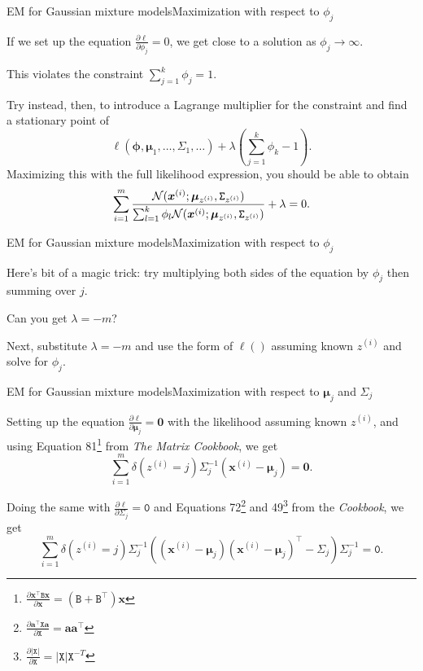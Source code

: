 \documentclass{beamer}
\renewcommand{\vec}[1]{\boldsymbol{#1}}
\newcommand{\mat}[1]{\mathtt{#1}}
\begin{document}
\begin{frame}{EM for Gaussian mixture models}{Maximization with respect to $\phi_j$}

  If we set up the equation
  $\frac{\partial \ell}{\partial \phi_j} = 0$,
  we get close to a solution as $\phi_j \rightarrow \infty$.

  \medskip

  This violates the constraint $\sum_{j=1}^k \phi_j = 1$.

  \medskip

  Try instead, then, to introduce a Lagrange multiplier for the
  constraint and find a stationary point of
  \[ \ell(\vec{\phi},\vec{\mu}_1,\ldots,\mat{\Sigma}_1,\ldots) + \lambda
  \left( \sum_{j=1}^k \phi_k - 1 \right). \]
  Maximizing this with the
  full likelihood expression, you should be able to obtain
  \[ \sum_{i=1}^m \frac{{\cal N}(\vec{x}^{(i)};\vec{\mu}_{z^{(i)}},\mat{\Sigma}_{z^{(i)}})}{\sum_{l=1}^k \phi_l {\cal N}(\vec{x}^{(i)};\vec{\mu}_{z^{(i)}},\mat{\Sigma}_{z^{(i)}})} + \lambda = 0. \]
  
\end{frame}


\begin{frame}{EM for Gaussian mixture models}{Maximization with respect to $\phi_j$}

  Here's bit of a magic trick: try multiplying both sides of the
  equation by $\phi_j$ then summing over $j$.

  \medskip

  Can you get $\lambda = -m$?

  \medskip

  Next, substitute $\lambda = -m$ and use the form of $\ell()$
  assuming known $z^{(i)}$ and solve for $\phi_j$.
  
\end{frame}


\begin{frame}{EM for Gaussian mixture models}{Maximization with respect to $\vec{\mu}_j$ and $\mat{\Sigma}_j$}

  Setting up the equation
  $\frac{\partial \ell}{\partial \vec{\mu}_j} = \vec{0}$
  with the likelihood assuming known $z^{(i)}$, and using
  Equation 81\footnote{$\frac{\partial \vec{x}^\top \mat{B} \vec{x}}{\partial \vec{x}} = (\mat{B}+\mat{B}^\top)\vec{x}$} from \textit{The Matrix Cookbook},
  we get
  \[ \sum_{i=1}^m \delta(z^{(i)}=j) \mat{\Sigma}^{-1}_j(\vec{x}^{(i)}-\vec{\mu}_j) = \vec{0}. \]

  Doing the same with $\frac{\partial \ell}{\partial \mat{\Sigma}_j} =
  \mat{0}$ and Equations 72\footnote{$\frac{\partial \vec{a}^\top
      \mat{X} \vec{a}}{\partial \mat{X}} = \vec{a}\vec{a}^\top$} and
  49\footnote{$\frac{\partial |\mat{X}|}{\partial \mat{X}} =
    |\mat{X}|\mat{X}^{-T}$} from the \textit{Cookbook}, we get
  \[ \sum_{i=1}^m \delta(z^{(i)} = j) \Sigma^{-1}_j \left((\vec{x}^{(i)}-\vec{\mu}_j)
  (\vec{x}^{(i)}-\vec{\mu}_j)^\top - \Sigma_j\right) \Sigma^{-1}_j = \mat{0}.
  \]
  
  

\end{frame}
\end{document}

